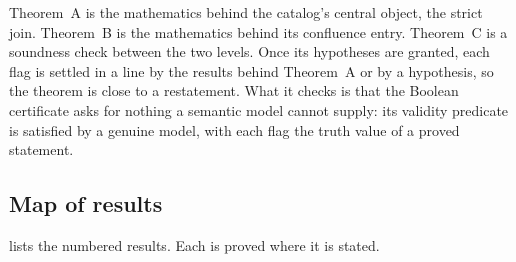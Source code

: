 Theorem~A is the mathematics behind the catalog's central object, the strict join.
Theorem~B is the mathematics behind its confluence entry. Theorem~C is a soundness
check between the two levels. Once its hypotheses are granted, each flag is settled in a
line by the results behind Theorem~A or by a hypothesis, so the theorem is close to a restatement. What it
checks is that the Boolean certificate asks for nothing a semantic model cannot supply:
its validity predicate is satisfied by a genuine model, with each flag the truth value of
a proved statement.

\subsection{Map of results}
\label{sec:intro-map}

 lists the numbered results. Each is proved where it is stated.

